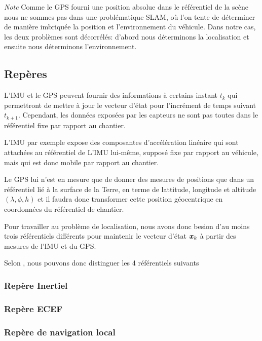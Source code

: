 \documentclass[12pt,a4paper]{report}
\begin{document}
	\textit{Note} Comme le GPS fourni une position absolue dans le référentiel de la scène nous ne sommes pas dans une problématique SLAM, où l'on tente de déterminer de manière imbriquée la position et l'environnement du véhicule. Dans notre cas, les deux problèmes sont décorrélés: d'abord nous déterminons la localisation et ensuite nous déterminons l'environnement. 
	
	\subsection{Repères}
	
	\para L'IMU et le GPS peuvent fournir des informations à certains instant $t_k$ qui permettront de mettre à jour le vecteur d'état pour l'incrément de temps suivant $t_{k+1}$. Cependant, les données exposées par les capteurs ne sont pas toutes dans le référentiel fixe par rapport au chantier.
	
	\para L'IMU par exemple expose des composantes d'accélération linéaire qui sont attachées au référentiel de L'IMU lui-même, supposé fixe par rapport au véhicule, mais qui est donc mobile par rapport au chantier.
	
	\para Le GPS lui n'est en mesure que de donner des mesures de positions que dans un référentiel lié à la surface de la Terre, en terme de lattitude, longitude et altitude $(\lambda, \phi, h)$ et il faudra donc transformer cette position géocentrique en coordonnées du référentiel de chantier.
	
	\para Pour travailler au problème de localisation, nous avons donc besion d'au moins trois référentiels différents pour maintenir le vecteur d'état $\boldsymbol{x}_k$ à partir des mesures de l'IMU et du GPS.
	
	\para Selon \cite{gustavsson_uav_2015}, nous pouvons donc distinguer les 4 référentiels suivants
	
	\subsubsection{Repère Inertiel}
	
	\subsubsection{Repère ECEF}
	
	\subsubsection{Repère de navigation local}
	
\end{document}
